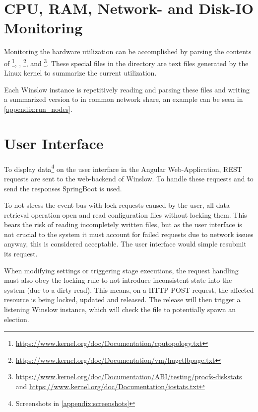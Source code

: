 \section{CPU, RAM, Network- and Disk-IO Monitoring}
\label{design:monitor_resources}


Monitoring the hardware utilization can be accomplished by parsing the contents of \footnote{\url{https://www.kernel.org/doc/Documentation/cputopology.txt}}, , \footnote{\url{https://www.kernel.org/doc/Documentation/vm/hugetlbpage.txt}},  and \linebreak{}\footnote{\url{https://www.kernel.org/doc/Documentation/ABI/testing/procfs-diskstats} and \url{https://www.kernel.org/doc/Documentation/iostats.txt}}.
These special files in the  directory are text files generated by the Linux kernel to summarize the current utilization\cite{linux:doc:proc}.

Each Winslow instance is repetitively reading and parsing these files and writing a summarized version to  in common network share, an example can be seen in \autoref{appendix:run_nodes}.

\section{User Interface}
\label{design:springboot}

To display data\footnote{Screenshots in \autoref{appendix:screenshots}} on the user interface in the Angular Web-Application, REST requests are sent to the web-backend of Winslow.
To handle these requests and to send the responses SpringBoot\cite{springboot} is used.

To not stress the event bus with lock requests caused by the user, all data retrieval operation open and read configuration files without locking them.
This bears the risk of reading incompletely written files, but as the user interface is not crucial to the system it must account for failed requests due to network issues anyway, this is considered acceptable.
The user interface would simple resubmit its request. 

When modifying settings or triggering stage executions, the request handling must also obey the locking rule to not introduce inconsistent state into the system (due to a dirty read).
This means, on a HTTP POST request, the affected resource is being locked, updated and released.
The release will then trigger a listening Winslow instance, which will check the file to potentially spawn an election.


